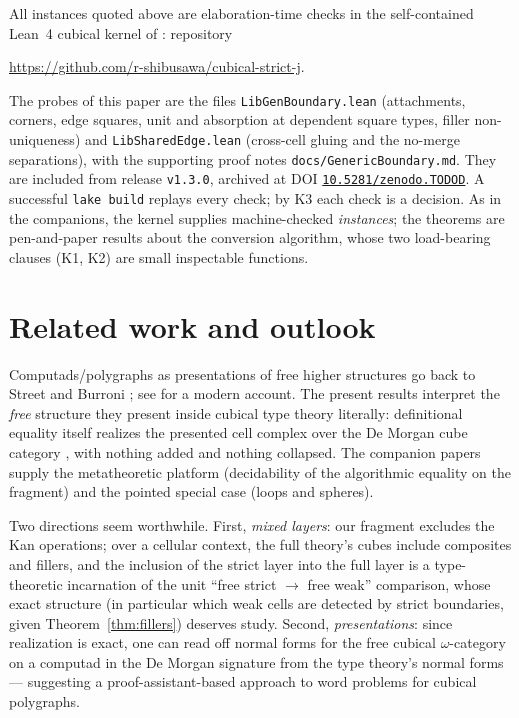 \documentclass[11pt]{amsart}
\theoremstyle{definition}
\begin{document}
All instances quoted above are elaboration-time checks in the
self-contained Lean~4 cubical kernel of \cite{Const}: repository
\begin{center}
  \url{https://github.com/r-shibusawa/cubical-strict-j}.
\end{center}
The probes
of this paper are the files \texttt{LibGenBoundary.lean}
(attachments, corners, edge squares, unit and absorption at
dependent square types, filler non-uniqueness) and
\texttt{LibSharedEdge.lean} (cross-cell gluing and the no-merge
separations), with the supporting proof notes
\texttt{docs/\allowbreak GenericBoundary.md}.  They are included
from release \texttt{v1.3.0}, archived at DOI
\href{https://doi.org/10.5281/zenodo.21638976}%
{\texttt{10.5281/zenodo.\allowbreak TODOD}}.  A successful \texttt{lake build}
replays every check; by K3 each check is a decision.  As in the
companions, the kernel supplies machine-checked \emph{instances};
the theorems are pen-and-paper results about the conversion
algorithm, whose two load-bearing clauses (K1, K2) are small
inspectable functions.

\section{Related work and outlook}
\label{sec:related}

Computads/polygraphs as presentations of free higher structures go
back to Street and Burroni \cite{Burroni}; see \cite{Polygraphs}
for a modern account.  The present results interpret the
\emph{free} structure they present inside cubical type theory
\cite{CCHM} literally: definitional equality itself realizes the
presented cell complex over the De Morgan cube category
\cite{GrandisMauri,BuchholtzMorehouse}, with nothing added and
nothing collapsed.  The companion papers \cite{Const,Sphere}
supply the metatheoretic platform (decidability of the algorithmic
equality on the fragment) and the pointed special case (loops and
spheres).

Two directions seem worthwhile.  First, \emph{mixed layers}: our
fragment excludes the Kan operations; over a cellular context, the
full theory's cubes include composites and fillers, and the
inclusion of the strict layer into the full layer is a
type-theoretic incarnation of the unit ``free strict
$\to$ free weak'' comparison, whose exact structure (in particular
which weak cells are detected by strict boundaries, given
Theorem~\ref{thm:fillers}) deserves study.  Second,
\emph{presentations}: since realization is exact, one can read off
normal forms for the free cubical $\omega$-category on a computad
in the De Morgan signature from the type theory's normal forms ---
suggesting a proof-assistant-based approach to word problems for
cubical polygraphs.
\end{document}
